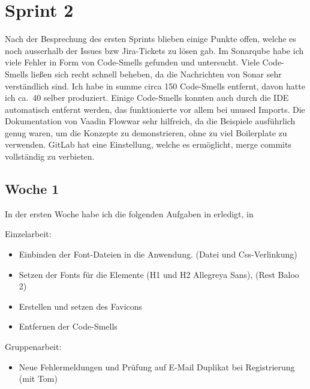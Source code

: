 

\section{Sprint 2}\label{sec:sprint2}
Nach der Besprechung des ersten Sprints blieben einige Punkte offen, welche es noch ausserhalb der Issues bzw Jira-Tickets zu lösen gab.
Im Sonarqube habe ich viele Fehler in Form von Code-Smells gefunden und untersucht.
Viele Code-Smells ließen sich recht schnell beheben, da die Nachrichten von Sonar sehr verständlich sind.
Ich habe in summe circa 150 Code-Smells entfernt, davon hatte ich ca.\ 40 selber produziert.
Einige Code-Smells konnten auch durch die IDE automatisch entfernt werden, das funktionierte vor allem bei unused Imports.
Die Dokumentation von Vaadin Flow\cite*[]{flowdocumentation}war sehr hilfreich, da die Beispiele ausführlich genug waren,
um die Konzepte zu demonstrieren, ohne zu viel Boilerplate zu verwenden.
GitLab hat eine Einstellung, welche es ermöglicht, merge commits vollständig zu verbieten.

\subsection{Woche 1}\label{subsec:s2w1}
In der ersten Woche habe ich die folgenden Aufgaben in erledigt, in

Einzelarbeit:
\begin{itemize}
    \item Einbinden der Font-Dateien in die Anwendung. (Datei und Css-Verlinkung)
    \item Setzen der Fonts für die Elemente (H1 und H2 Allegreya Sans), (Rest Baloo 2)
    \item Erstellen und setzen des Favicons
    \item Entfernen der Code-Smells

\end{itemize}

Gruppenarbeit:

\begin{itemize}
    \item Neue Fehlermeldungen und Prüfung auf E-Mail Duplikat bei Registrierung (mit Tom)

\end{itemize}